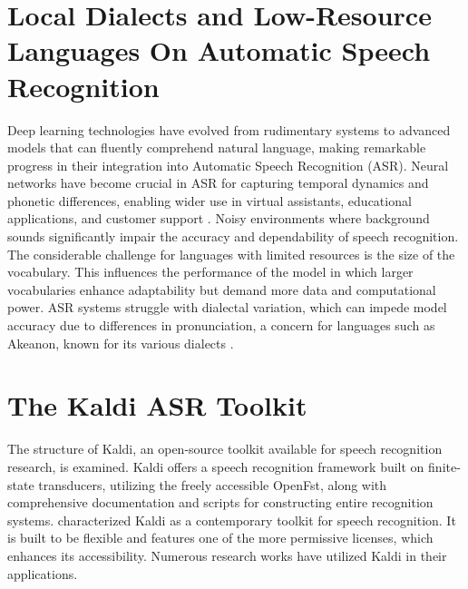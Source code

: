 \section{Local Dialects and Low-Resource Languages On Automatic Speech Recognition}
\label{sec:LocalDialects}
Deep learning technologies have evolved from rudimentary systems to advanced models that can fluently comprehend natural language, making remarkable progress in their integration into Automatic Speech Recognition (ASR). Neural networks have become crucial in ASR for capturing temporal dynamics and phonetic differences, enabling wider use in virtual assistants, educational applications, and customer support . Noisy environments where background sounds significantly impair the accuracy and dependability of speech recognition. The considerable challenge for languages with limited resources is the size of the vocabulary. This influences the performance of the model in which larger vocabularies enhance adaptability but demand more data and computational power. ASR systems struggle with dialectal variation, which can impede model accuracy due to differences in pronunciation, a concern for languages such as Akeanon, known for its various dialects . 

\section{The Kaldi ASR Toolkit}
\label{sec: KALDI}
The structure of Kaldi, an open-source toolkit available for speech recognition research, is examined. Kaldi offers a speech recognition framework built on finite-state transducers, utilizing the freely accessible OpenFst, along with comprehensive documentation and scripts for constructing entire recognition systems.
 characterized Kaldi as a contemporary toolkit for speech recognition. It is built to be flexible and features one of the more permissive licenses, which enhances its accessibility. Numerous research works have utilized Kaldi in their applications.

